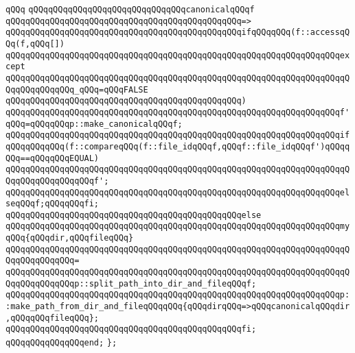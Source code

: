 \verb|qQQq|\newline
\verb|qQQqqQQqqQQqqQQqqQQqqQQqqQQqqQQqcanonicalqQQqf|\newline
\verb|qQQqqQQqqQQqqQQqqQQqqQQqqQQqqQQqqQQqqQQqqQQqqQQq=>|\newline
\verb|qQQqqQQqqQQqqQQqqQQqqQQqqQQqqQQqqQQqqQQqqQQqqQQqifqQQqqQQq(f::accessqQQq(f,qQQq[])|\newline
\verb|qQQqqQQqqQQqqQQqqQQqqQQqqQQqqQQqqQQqqQQqqQQqqQQqqQQqqQQqqQQqqQQqqQQqexcept|\newline
\verb|qQQqqQQqqQQqqQQqqQQqqQQqqQQqqQQqqQQqqQQqqQQqqQQqqQQqqQQqqQQqqQQqqQQqqQQqqQQqqQQqqQQq_qQQq=qQQqFALSE|\newline
\verb|qQQqqQQqqQQqqQQqqQQqqQQqqQQqqQQqqQQqqQQqqQQqqQQq)|\newline
\verb|qQQqqQQqqQQqqQQqqQQqqQQqqQQqqQQqqQQqqQQqqQQqqQQqqQQqqQQqqQQqqQQqqQQqf'qQQq=qQQqqQQqp::make_canonicalqQQqf;|\newline
\newline
\verb|qQQqqQQqqQQqqQQqqQQqqQQqqQQqqQQqqQQqqQQqqQQqqQQqqQQqqQQqqQQqqQQqqQQqifqQQqqQQqqQQq(f::compareqQQq(f::file_idqQQqf,qQQqf::file_idqQQqf')qQQqqQQq==qQQqqQQqEQUAL)|\newline
\verb|qQQqqQQqqQQqqQQqqQQqqQQqqQQqqQQqqQQqqQQqqQQqqQQqqQQqqQQqqQQqqQQqqQQqqQQqqQQqqQQqqQQqqQQqf';|\newline
\verb|qQQqqQQqqQQqqQQqqQQqqQQqqQQqqQQqqQQqqQQqqQQqqQQqqQQqqQQqqQQqqQQqqQQqelseqQQqf;qQQqqQQqfi;|\newline
\verb|qQQqqQQqqQQqqQQqqQQqqQQqqQQqqQQqqQQqqQQqqQQqqQQqelse|\newline
\verb|qQQqqQQqqQQqqQQqqQQqqQQqqQQqqQQqqQQqqQQqqQQqqQQqqQQqqQQqqQQqqQQqqQQqmyqQQq{qQQqdir,qQQqfileqQQq}|\newline
\verb|qQQqqQQqqQQqqQQqqQQqqQQqqQQqqQQqqQQqqQQqqQQqqQQqqQQqqQQqqQQqqQQqqQQqqQQqqQQqqQQqqQQq=|\newline
\verb|qQQqqQQqqQQqqQQqqQQqqQQqqQQqqQQqqQQqqQQqqQQqqQQqqQQqqQQqqQQqqQQqqQQqqQQqqQQqqQQqqQQqp::split_path_into_dir_and_fileqQQqf;|\newline
\newline
\verb|qQQqqQQqqQQqqQQqqQQqqQQqqQQqqQQqqQQqqQQqqQQqqQQqqQQqqQQqqQQqqQQqqQQqp::make_path_from_dir_and_fileqQQqqQQq{qQQqdirqQQq=>qQQqcanonicalqQQqdir,qQQqqQQqfileqQQq};|\newline
\verb|qQQqqQQqqQQqqQQqqQQqqQQqqQQqqQQqqQQqqQQqqQQqqQQqfi;|\newline
\verb|qQQqqQQqqQQqqQQqend;|\newline
\verb|};|\newline
\newline

